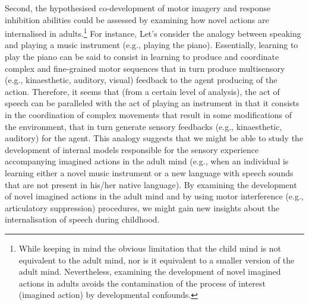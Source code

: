 \documentclass[utf8]{template/frontiersSCNS} %
\begin{document}

Second, the hypothesised co-development of motor imagery and response inhibition abilities could be assessed by examining how novel actions are internalised in adults.\footnote{While keeping in mind the obvious limitation that the child mind is not equivalent to the adult mind, nor is it equivalent to a smaller version of the adult mind. Nevertheless, examining the development of novel imagined actions in adults avoids the contamination of the process of interest (imagined action) by developmental confounds.} For instance, Let’s consider the analogy between speaking and playing a music instrument (e.g., playing the piano). Essentially, learning to play the piano can be said to consist in learning to produce and coordinate complex and fine-grained motor sequences that in turn produce multisensory (e.g., kinaesthetic, auditory, visual) feedback to the agent producing of the action. Therefore, it seems that (from a certain level of analysis), the act of speech can be paralleled with the act of playing an instrument in that it consists in the coordination of complex movements that result in some modifications of the environment, that in turn generate sensory feedbacks (e.g., kinaesthetic, auditory) for the agent. This analogy suggests that we might be able to study the development of internal models responsible for the sensory experience accompanying imagined actions in the adult mind (e.g., when an individual is learning either a novel music instrument or a new language with speech sounds that are not present in his/her native language). By examining the development of novel imagined actions in the adult mind and by using motor interference (e.g., articulatory suppression) procedures, we might gain new insights about the internalisation of speech during childhood.


\end{document}
